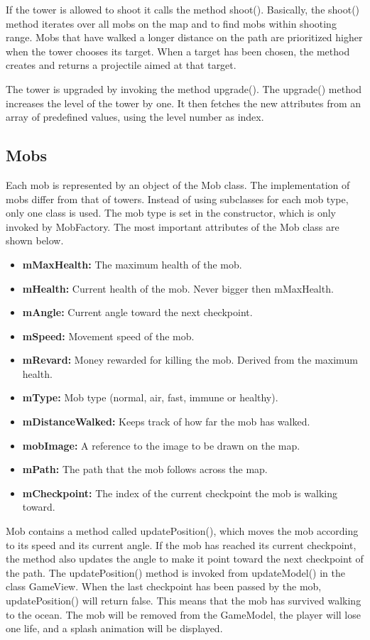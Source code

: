 If the tower is allowed to shoot it calls the method shoot(). Basically, the shoot() method iterates over all mobs on the map and to find mobs within shooting range. Mobs that have walked a longer distance on the path are prioritized higher when the tower chooses its target. When a target has been chosen, the method creates and returns a projectile aimed at that target.

The tower is upgraded by invoking the method upgrade(). The upgrade() method increases the level of the tower by one. It then fetches the new attributes from an array of predefined values, using the level number as index.

\subsection{Mobs}

Each mob is represented by an object of the Mob class. The implementation of mobs differ from that of towers. Instead of using subclasses for each mob type, only one class is used. The mob type is set in the constructor, which is only invoked by MobFactory. The most important attributes of the Mob class are shown below.

\begin{itemize}

\item {\bf mMaxHealth:} The maximum health of the mob.
\item {\bf mHealth:} Current health of the mob. Never bigger then mMaxHealth.
\item {\bf mAngle:} Current angle toward the next checkpoint.
\item {\bf mSpeed:} Movement speed of the mob.
\item {\bf mRevard:} Money rewarded for killing the mob. Derived from the maximum health.
\item {\bf mType: } Mob type (normal, air, fast, immune or healthy).
\item {\bf mDistanceWalked:} Keeps track of how far the mob has walked.
\item {\bf mobImage:} A reference to the image to be drawn on the map.
\item {\bf mPath:} The path that the mob follows across the map.
\item {\bf mCheckpoint:} The index of the current checkpoint the mob is walking toward.

\end{itemize}

Mob contains a method called updatePosition(), which moves the mob according to its speed and its current angle. If the mob has reached its current checkpoint, the method also updates the angle to make it point toward the next checkpoint of the path. The updatePosition() method is invoked from updateModel() in the class GameView. When the last checkpoint has been passed by the mob, updatePosition() will return false. This means that the mob has survived walking to the ocean. The mob will be removed from the GameModel, the player will lose one life, and a splash animation will be displayed.

